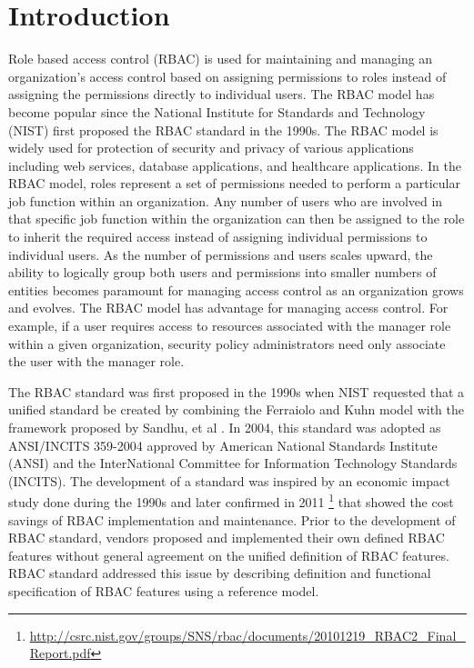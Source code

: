 \section{Introduction} \label{sec:introduction}

Role based access control (RBAC) is used for maintaining and managing an organization's access control based on assigning permissions to roles instead of assigning the permissions directly to individual users. The RBAC model has become popular since the National Institute for Standards and Technology (NIST) first proposed the RBAC standard in the 1990s. The RBAC model is widely used for protection of security and privacy of various applications including web services, database applications, and healthcare applications. 
In the RBAC model, roles represent a set of permissions needed to perform a particular job function within an organization.  
Any number of users who are involved in that specific job function within the organization can then be assigned to the role to inherit the required access instead of assigning individual permissions to individual users. 
As the number of permissions and users scales upward, the ability to logically group both users and permissions into smaller numbers of entities becomes paramount for managing access control as an organization grows and evolves. The RBAC model has advantage for managing access control. For example, if a user requires access to resources associated with the manager role within a given organization, security policy administrators need only associate the user with the manager role.

The RBAC standard was first proposed in the 1990s when NIST 
requested that a unified standard be created by combining the Ferraiolo and Kuhn model \cite{ferraiolokuhn} with the framework 
proposed by Sandhu, et al \cite{sandhu1996role}.  
In 2004, this standard was adopted as ANSI/INCITS 359-2004 approved by American National Standards Institute (ANSI) and the InterNational Committee for Information Technology Standards (INCITS). 
The development of a standard was inspired by an economic impact study done during the 1990s and later confirmed in 2011 \footnote{\url{http://csrc.nist.gov/groups/SNS/rbac/documents/20101219_RBAC2_Final_Report.pdf}} that showed the cost savings of RBAC implementation and maintenance. Prior to the development of RBAC standard, vendors proposed and implemented their own defined RBAC features without general agreement on the unified definition of RBAC features. RBAC standard addressed this issue by describing definition and functional specification of RBAC features using a reference model.

